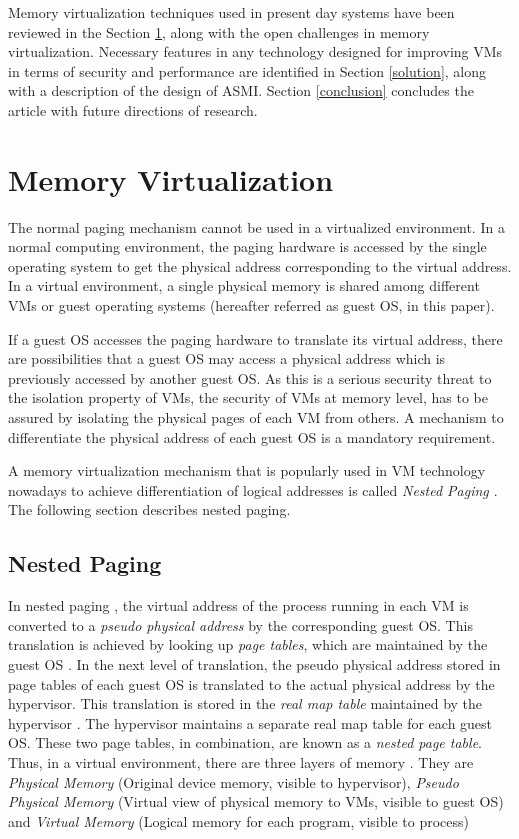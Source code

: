 \documentclass[a4paper,10pt,twocolumn]{article}
\begin{document}
 Memory virtualization techniques used in present day systems have been reviewed in the Section \ref{memory}, along with the open challenges in memory virtualization. Necessary features in any technology designed  for improving VMs in terms of security and performance are identified in Section \ref{solution}, along with a description of the design of ASMI. Section  \ref{conclusion} concludes the article with future directions of research.

  \section{Memory Virtualization} \label{memory}

  The normal paging mechanism cannot be used \cite{Smith2006} in a virtualized environment. In a normal computing environment, the paging hardware is accessed by the single operating system to get the physical address corresponding to the virtual address. In a virtual environment, a single physical memory is shared among different VMs or guest operating systems (hereafter referred as guest OS, in this paper). 
  
  If a guest OS accesses the paging hardware to translate its virtual address, there are possibilities that a guest OS may access a physical address which is previously accessed by another guest OS. As this is a serious security threat to the isolation property of VMs, the security of VMs at memory level, has to be assured by isolating the physical pages of each VM from others. A mechanism  to differentiate the physical address of each guest OS is a mandatory requirement.

  A memory virtualization mechanism that is popularly used in VM technology nowadays to achieve differentiation of logical addresses is called \textit{Nested Paging \cite{Smith2006}}. The following section describes nested paging.


  \subsection{Nested Paging}

  In nested paging \cite{Smith2006}, the virtual address of the process running in each VM is converted to a \textit{pseudo physical address} by the corresponding guest OS. This translation is achieved by looking up   \emph{page tables}, which are maintained by the guest OS \cite{Smith2006}. In the next level of translation, the pseudo physical address stored in page tables of each guest OS is translated to the actual physical address by the hypervisor. This translation is stored in the \textit{real map table} maintained by the hypervisor \cite{Smith2006}. The hypervisor maintains  a separate real map table for each guest OS. These two page tables, in combination, are known as a \textit{nested page table}. Thus, in a virtual environment, there are three layers of memory \cite{Smith2006}. They are \emph{Physical Memory} (Original device memory, visible to hypervisor), \emph{Pseudo Physical Memory} (Virtual view of physical memory to VMs, visible to guest OS) and \emph{Virtual Memory} (Logical memory for each 
program, visible to process)
\end{document}
